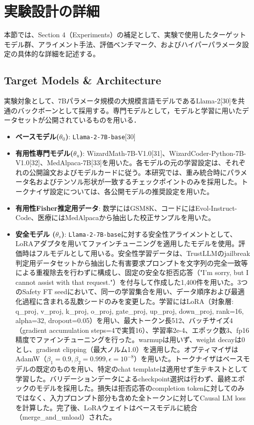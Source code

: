 \documentclass{article}
\begin{document}
\section{実験設計の詳細}
本節では、Section 4（Experiments）の補足として、実験で使用したターゲットモデル群、アライメント手法、評価ベンチマーク、およびハイパーパラメータ設定の具体的な詳細を記述する。

\subsection{Target Models \& Architecture}
実験対象として、7Bパラメータ規模の大規模言語モデルであるLlama-2[30]を共通のバックボーンとして採用する。専門モデルとして，モデルと学習に用いたデータセットが公開されているものを用いる．


\begin{itemize}
\item \textbf{ベースモデル($\theta_0$)}: \texttt{Llama-2-7B-base}[30]
\item \textbf{有用性専門モデル($\theta_u$)}: WizardMath-7B-V1.0[31]、WizardCoder-Python-7B-V1.0[32]、MedAlpaca-7B[33]を用いた。各モデルの元の学習設定は、それぞれの公開論文およびモデルカードに従う。本研究では、重み統合時にパラメータ名およびテンソル形状が一致するチェックポイントのみを採用した。トークナイザ設定については、各公開モデルの推奨設定を用いた。
\item \textbf{有用性Fisher推定用データ}: 数学にはGSM8K、コードにはEvol-Instruct-Code、医療にはMedAlpacaから抽出した校正サンプルを用いた。
\item \textbf{安全モデル ($\theta_s$)}: \texttt{Llama-2-7B-base}に対する安全性アライメントとして、LoRAアダプタを用いてファインチューニングを適用したモデルを使用。評価時はフルモデルとして用いる。安全性学習データは、TrustLLMのjailbreak判定用データセットから抽出した有害要求プロンプトを文字列の完全一致等による重複除去を行わずに構成し、固定の安全な拒否応答（"I'm sorry, but I cannot assist with that request."）を付与して作成した1,400件を用いた。3つのSafety FT seedにおいて、同一の学習集合を用い、データ順序および最適化過程に含まれる乱数シードのみを変更した。学習にはLoRA（対象層: q\_proj, v\_proj, k\_proj, o\_proj, gate\_proj, up\_proj, down\_proj, rank=16, alpha=32, dropout=0.05）を用い、最大トークン長512、バッチサイズ4（gradient accumulation steps=4で実質16）、学習率2e-4、エポック数3、fp16精度でファインチューニングを行った。warmupは用いず、weight decayは0とし、gradient clipping（最大ノルム1.0）を適用した。オプティマイザはAdamW（\(\beta_1=0.9, \beta_2=0.999, \epsilon=10^{-8}\)）を用いた。トークナイザはベースモデルの既定のものを用い、特定のchat templateは適用せず生テキストとして学習した。バリデーションデータによるcheckpoint選択は行わず、最終エポックのモデルを採用した。損失は拒否応答のcompletion tokenに対してのみではなく、入力プロンプト部分も含めた全トークンに対してCausal LM lossを計算した。完了後、LoRAウェイトはベースモデルに統合（merge\_and\_unload）された。
\end{itemize}
\end{document}
